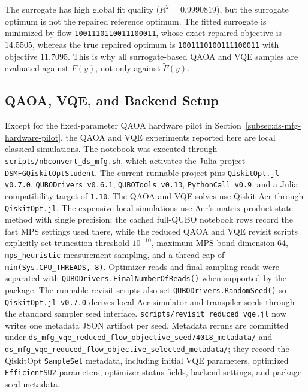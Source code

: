 The surrogate has high global fit quality ($R^2 = 0.9990819$), but the
surrogate optimum is not the repaired reference optimum. The fitted surrogate is
minimized by flow \texttt{1001110110011100011}, whose exact repaired objective
is $14.5505$, whereas the true repaired optimum is
\texttt{1001110100111100011} with objective $11.7095$. This is why all
surrogate-based QAOA and VQE samples are evaluated against $F(y)$, not only
against $\widetilde{F}(y)$.

\subsection{QAOA, VQE, and Backend Setup}
\label{subsec:ds-mfg-computational-setup}

Except for the fixed-parameter QAOA hardware pilot in
Section~\ref{subsec:ds-mfg-hardware-pilot}, the QAOA and VQE experiments
reported here are local classical simulations. The notebook was executed through
\texttt{scripts/nbconvert\_ds\_mfg.sh}, which activates the Julia project
\texttt{DSMFGQiskitOptStudent}. The current runnable project pins
\texttt{QiskitOpt.jl v0.7.0}, \texttt{QUBODrivers v0.6.1},
\texttt{QUBOTools v0.13}, \texttt{PythonCall v0.9}, and a Julia compatibility
target of \texttt{1.10}. The QAOA and VQE solves use
Qiskit Aer through \texttt{QiskitOpt.jl}. The expensive local simulations use
Aer's matrix-product-state method with single precision; the cached full-QUBO
notebook rows record the fast MPS settings used there, while the reduced QAOA
and VQE revisit scripts explicitly set truncation threshold $10^{-10}$,
maximum MPS bond dimension 64, \texttt{mps\_heuristic} measurement sampling,
and a thread cap of \texttt{min(Sys.CPU\_THREADS, 8)}. Optimizer reads and final
sampling reads were separated with \texttt{QUBODrivers.FinalNumberOfReads()}
when supported by the package. The runnable revisit scripts also set
\texttt{QUBODrivers.RandomSeed()} so \texttt{QiskitOpt.jl v0.7.0} derives local
Aer simulator and transpiler seeds through the standard sampler seed interface.
\texttt{scripts/revisit\_reduced\_vqe.jl} now writes one metadata JSON artifact
per seed. Metadata reruns are committed under
\texttt{ds\_mfg\_vqe\_reduced\_flow\_objective\_seed74018\_metadata/} and
\texttt{ds\_mfg\_vqe\_reduced\_flow\_objective\_selected\_metadata/}; they
record the QiskitOpt \texttt{SampleSet} metadata, including initial VQE
parameters, optimized \texttt{EfficientSU2} parameters, optimizer status fields,
backend settings, and package seed metadata.

